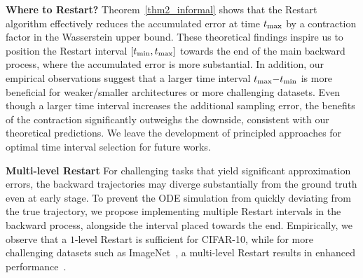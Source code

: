 \textbf{Where to Restart? } Theorem~\ref{thm2_informal} shows that the Restart algorithm effectively reduces the accumulated error at time $t_{\textrm{max}}$ by a contraction factor in the Wasserstein upper bound. These theoretical findings inspire us to position the Restart interval $[t_{\textrm{min}}, t_{\textrm{max}}]$ towards the end of the main backward process, where the accumulated error is more substantial. In addition, our empirical observations suggest that a larger time interval $t_{\textrm{max}} {-} t_{\textrm{min}}$ is more beneficial for weaker/smaller architectures or more challenging datasets. Even though a larger time interval increases the additional sampling error, the benefits of the contraction significantly outweighs the downside, consistent with our theoretical predictions. We leave the development of principled approaches for optimal time interval selection for future works.

\textbf{Multi-level Restart } 
For challenging tasks that yield significant approximation errors, the backward trajectories may diverge substantially from the ground truth even at early stage. To prevent the ODE simulation from quickly deviating from the true trajectory, we propose implementing multiple Restart intervals in the backward process, alongside the interval placed towards the end. Empirically, we observe that a $1$-level Restart is sufficient for CIFAR-10, while for more challenging datasets such as ImageNet~\cite{Deng2009ImageNetAL}, a multi-level Restart results in enhanced performance~\cite{Deng2009ImageNetAL}.